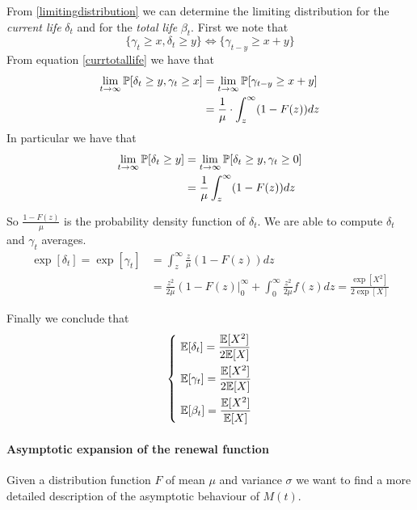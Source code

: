 From \ref{limitingdistribution} we can determine the limiting distribution for the \textit{current life} $\delta_t$ and for the \textit{total life} $\beta_t$. First we note that
\begin{equation} \label{currtotallife}
	\{\gamma_t \geq x, \delta_t \geq y \}
	\Leftrightarrow
	\{\gamma_{t-y} \geq x+y \}
\end{equation}
From equation \ref{currtotallife} we have that
\begin{align*}
	\lim_{t \rightarrow \infty} \prob[\delta_t \geq y, \gamma_t \geq x] & = \lim_{t \rightarrow \infty} \prob[\gamma_{t-y} \geq x+y] \\ & = \frac{1}{\mu} \cdot \int_z^{\infty}(1-F(z))dz
\end{align*}
In particular we have that
\begin{align*}
	\lim_{t \rightarrow \infty} \prob[\delta_t \geq y] & = \lim_{t \rightarrow \infty} \prob[\delta_t \geq y, \gamma_{t} \geq 0] \\ & = \frac{1}{\mu} \int_z^{\infty}(1-F(z))dz
\end{align*}

So $\frac{1-F(z)}{\mu}$ is the probability density function of $\delta_t$. We are able to compute $\delta_t$ and $\gamma_t$ averages.
\begin{align*}
	\exp[\delta_t]=\exp[\gamma_t] & =\int_z^{\infty} \frac{z}{\mu} (1-F(z))dz \\ & = \frac{z^2}{2\mu} \left( 1-F(z) \right|_0^{\infty} + \int_0^{\infty}\frac{z^2}{2 \mu} f(z)dz= \frac{\exp[X^2]}{2 \exp[X]}
\end{align*}

Finally we conclude that
\begin{equation*}
	\begin{dcases}
		~ \exp[\delta_t] = \frac{\exp[X^2]}{2 \exp[X]} \\
		~ \exp[\gamma_t] = \frac{\exp[X^2]}{2 \exp[X]} \\
		~ \exp[\beta_t] = \frac{\exp[X^2]}{\exp[X]}
	\end{dcases}
\end{equation*}


\paragraph{Asymptotic expansion of the renewal function}
Given a distribution function $F$ of mean $\mu$ and variance $\sigma$ we want to find a more detailed description of the asymptotic behaviour of $M(t)$.

